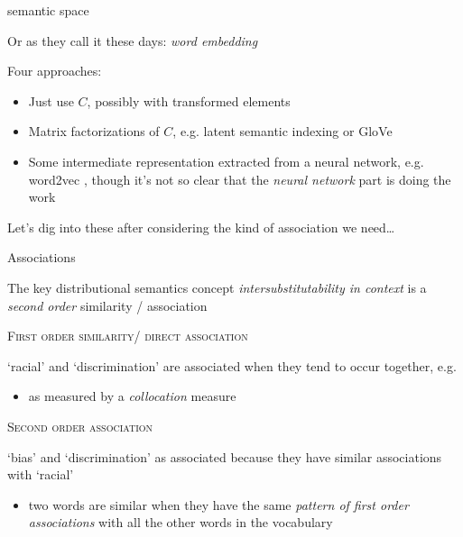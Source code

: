\documentclass{hertieteaching}
\begin{document}
\begin{frame}[fragile]{semantic space}

Or as they call it these days: \textit{word embedding}

Four approaches:
\begin{itemize}
  \item Just use $C$, possibly with transformed elements \parencite{Bullinaria.Levy2012}
  \item Matrix factorizations of $C$, e.g. latent semantic indexing \parencite[LSI;][]{Landauer.Dumais1997} or \textsf{GloVe} \parencite{Pennington.etal2014}
  \item Some intermediate representation extracted from a neural network, e.g. \textsf{word2vec} \parencite{Mikolov.etal2013}, though it's not so clear that the \textit{neural network} part is doing the work
\end{itemize}

Let's dig into these after considering the kind of association we need\ldots

\end{frame}
\begin{frame}{Associations}

The key distributional semantics concept \textit{intersubstitutability in context} is a \textit{second order} similarity / association

\medskip

\textsc{First order similarity/ direct association}

`racial' and `discrimination' are associated when they tend to occur together, e.g.
\begin{itemize}
  \item as measured by a \textit{collocation} measure
\end{itemize}

\pause

\textsc{Second order association}

`bias' and `discrimination' as associated because they have similar associations with `racial'
\begin{itemize}
  \item two words are similar when they have the same \textit{pattern of first order associations} with all the other words in the vocabulary
\end{itemize}

\end{frame}
\end{document}
